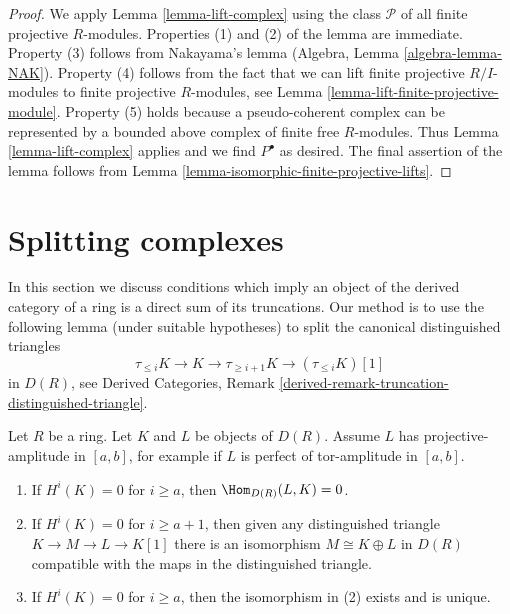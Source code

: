 \begin{proof}
We apply Lemma \ref{lemma-lift-complex} using the class $\mathcal{P}$
of all finite projective $R$-modules. Properties (1) and (2)
of the lemma are immediate.
Property (3) follows from Nakayama's lemma
(Algebra, Lemma \ref{algebra-lemma-NAK}).
Property (4) follows from the fact that we can lift finite projective
$R/I$-modules to finite projective $R$-modules, see
Lemma \ref{lemma-lift-finite-projective-module}.
Property (5) holds because a pseudo-coherent complex can be represented
by a bounded above complex of finite free $R$-modules.
Thus Lemma \ref{lemma-lift-complex} applies and we find $P^\bullet$
as desired. The final assertion of the lemma follows from
Lemma \ref{lemma-isomorphic-finite-projective-lifts}.
\end{proof}



\section{Splitting complexes}
\label{section-splitting}

\noindent
In this section we discuss conditions which imply an object of the
derived category of a ring is a direct sum of its truncations.
Our method is to use the following lemma (under suitable hypotheses)
to split the canonical distinguished triangles
$$
\tau_{\leq i}K \to K \to \tau_{\geq i + 1}K \to (\tau_{\leq i}K)[1]
$$
in $D(R)$, see Derived Categories, Remark
\ref{derived-remark-truncation-distinguished-triangle}.

\begin{lemma}
\label{lemma-splitting-unique}
Let $R$ be a ring. Let $K$ and $L$ be objects of $D(R)$.
Assume $L$ has projective-amplitude in $[a, b]$, for example if $L$
is perfect of tor-amplitude in $[a, b]$.
\begin{enumerate}
\item If $H^i(K) = 0$ for $i \geq a$, then
$\Hom_{D(R)}(L, K) = 0$.
\item If $H^i(K) = 0$ for $i \geq a + 1$, then given any distinguished
triangle $K \to M \to L \to K[1]$
there is an isomorphism $M \cong K \oplus L$
in $D(R)$ compatible with the maps in the distinguished triangle.
\item If $H^i(K) = 0$ for $i \geq a$, then the isomorphism
in (2) exists and is unique.
\end{enumerate}
\end{lemma}

